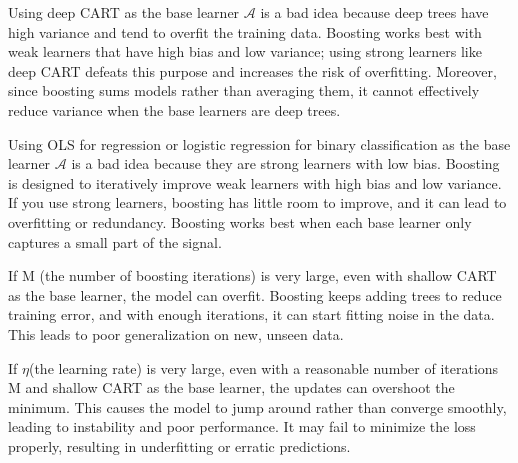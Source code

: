 \documentclass[12pt]{article}
\begin{document}
\begin{enumerate}

Using deep CART as the base learner $\mathcal{A}$ is a bad idea because deep trees have high variance and tend to overfit the training data. Boosting works best with weak learners that have high bias and low variance; using strong learners like deep CART defeats this purpose and increases the risk of overfitting. Moreover, since boosting sums models rather than averaging them, it cannot effectively reduce variance when the base learners are deep trees.


Using OLS for regression or logistic regression for binary classification as the base learner $\mathcal{A}$ is a bad idea because they are strong learners with low bias. Boosting is designed to iteratively improve weak learners with high bias and low variance. If you use strong learners, boosting has little room to improve, and it can lead to overfitting or redundancy. Boosting works best when each base learner only captures a small part of the signal.


If M (the number of boosting iterations) is very large, even with shallow CART as the base learner, the model can overfit. Boosting keeps adding trees to reduce training error, and with enough iterations, it can start fitting noise in the data. This leads to poor generalization on new, unseen data. 


If $\eta $(the learning rate) is very large, even with a reasonable number of iterations M and shallow CART as the base learner, the updates can overshoot the minimum. This causes the model to jump around rather than converge smoothly, leading to instability and poor performance. It may fail to minimize the loss properly, resulting in underfitting or erratic predictions.

\end{enumerate}
\end{document}
